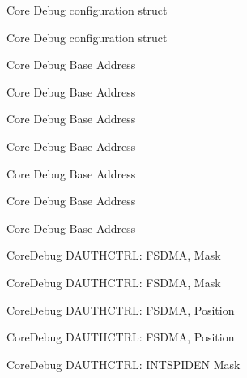 \begin{DoxyRefList}
\label{deprecated__deprecated000448}%
%
Core Debug configuration struct 

\label{deprecated__deprecated000551}%
%
Core Debug configuration struct  
\item[Member \mbox{\hyperlink{group__CMSIS__core__base_ga680604dbcda9e9b31a1639fcffe5230b}{Core\+Debug\+\_\+\+B\+A\+SE}} ]\label{deprecated__deprecated000099}%
%
Core Debug Base Address 

\label{deprecated__deprecated000153}%
%
Core Debug Base Address 

\label{deprecated__deprecated000229}%
%
Core Debug Base Address 

\label{deprecated__deprecated000292}%
%
Core Debug Base Address 

\label{deprecated__deprecated000371}%
%
Core Debug Base Address 

\label{deprecated__deprecated000447}%
%
Core Debug Base Address 

\label{deprecated__deprecated000550}%
%
Core Debug Base Address  
\item[Member \mbox{\hyperlink{group__CMSIS__CoreDebug_gab7f3f76af0236f8d3d3a090f50d4841a}{Core\+Debug\+\_\+\+D\+A\+U\+T\+H\+C\+T\+R\+L\+\_\+\+F\+S\+D\+M\+A\+\_\+\+Msk}} ]\label{deprecated__deprecated000084}%
%
Core\+Debug D\+A\+U\+T\+H\+C\+T\+RL\+: F\+S\+D\+MA, Mask 

\label{deprecated__deprecated000535}%
%
Core\+Debug D\+A\+U\+T\+H\+C\+T\+RL\+: F\+S\+D\+MA, Mask  
\item[Member \mbox{\hyperlink{group__CMSIS__CoreDebug_ga2b4fde73cbbbb0adeb686dc20ff705de}{Core\+Debug\+\_\+\+D\+A\+U\+T\+H\+C\+T\+R\+L\+\_\+\+F\+S\+D\+M\+A\+\_\+\+Pos}} ]\label{deprecated__deprecated000083}%
%
Core\+Debug D\+A\+U\+T\+H\+C\+T\+RL\+: F\+S\+D\+MA, Position 

\label{deprecated__deprecated000534}%
%
Core\+Debug D\+A\+U\+T\+H\+C\+T\+RL\+: F\+S\+D\+MA, Position  
\item[Member \mbox{\hyperlink{group__CMSIS__CoreDebug_ga1570f149a0f89f70fc2644a5842cbcb4}{Core\+Debug\+\_\+\+D\+A\+U\+T\+H\+C\+T\+R\+L\+\_\+\+I\+N\+T\+S\+P\+I\+D\+E\+N\+\_\+\+Msk}} ]\label{deprecated__deprecated000090}%
%
Core\+Debug D\+A\+U\+T\+H\+C\+T\+RL\+: I\+N\+T\+S\+P\+I\+D\+EN Mask 


\end{DoxyRefList}
